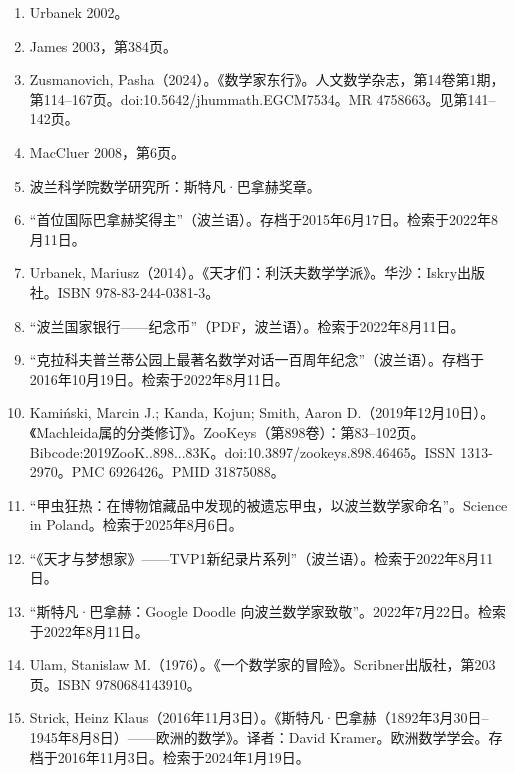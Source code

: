 \begin{enumerate}
\item Urbanek 2002。
\item James 2003，第384页。
\item Zusmanovich, Pasha（2024）。《数学家东行》。人文数学杂志，第14卷第1期，第114–167页。doi:10.5642/jhummath.EGCM7534。MR 4758663。见第141–142页。
\item MacCluer 2008，第6页。
\item 波兰科学院数学研究所：斯特凡·巴拿赫奖章。
\item “首位国际巴拿赫奖得主”（波兰语）。存档于2015年6月17日。检索于2022年8月11日。
\item  Urbanek, Mariusz（2014）。《天才们：利沃夫数学学派》。华沙：Iskry出版社。ISBN 978-83-244-0381-3。
\item “波兰国家银行——纪念币”（PDF，波兰语）。检索于2022年8月11日。
\item “克拉科夫普兰蒂公园上最著名数学对话一百周年纪念”（波兰语）。存档于2016年10月19日。检索于2022年8月11日。
\item Kamiński, Marcin J.; Kanda, Kojun; Smith, Aaron D.（2019年12月10日）。《Machleida属的分类修订》。ZooKeys（第898卷）：第83–102页。Bibcode:2019ZooK..898...83K。doi:10.3897/zookeys.898.46465。ISSN 1313-2970。PMC 6926426。PMID 31875088。
\item “甲虫狂热：在博物馆藏品中发现的被遗忘甲虫，以波兰数学家命名”。Science in Poland。检索于2025年8月6日。
\item “《天才与梦想家》——TVP1新纪录片系列”（波兰语）。检索于2022年8月11日。
\item “斯特凡·巴拿赫：Google Doodle 向波兰数学家致敬”。2022年7月22日。检索于2022年8月11日。
\item  Ulam, Stanislaw M.（1976）。《一个数学家的冒险》。Scribner出版社，第203页。ISBN 9780684143910。
\item Strick, Heinz Klaus（2016年11月3日）。《斯特凡·巴拿赫（1892年3月30日–1945年8月8日）——欧洲的数学》。译者：David Kramer。欧洲数学学会。存档于2016年11月3日。检索于2024年1月19日。
\end{enumerate}
